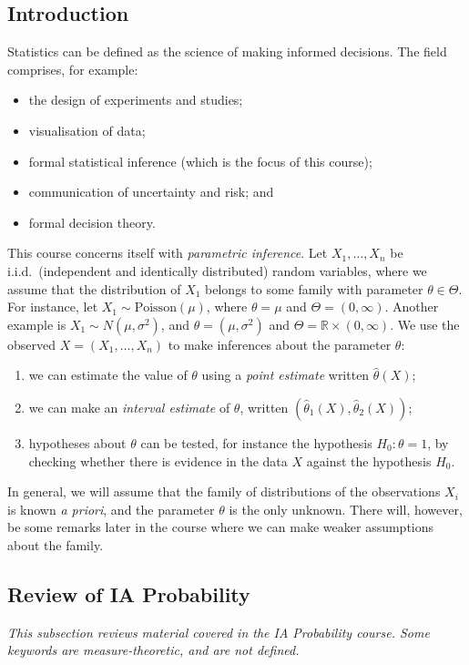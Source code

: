 \subsection{Introduction}
Statistics can be defined as the science of making informed decisions.
The field comprises, for example:
\begin{itemize}
	\item the design of experiments and studies;
	\item visualisation of data;
	\item formal statistical inference (which is the focus of this course);
	\item communication of uncertainty and risk; and
	\item formal decision theory.
\end{itemize}
This course concerns itself with \textit{parametric inference}.
Let \( X_1, \dots, X_n \) be i.i.d.\ (independent and identically distributed) random variables, where we assume that the distribution of \( X_1 \) belongs to some family with parameter \( \theta \in \Theta \).
For instance, let \( X_1 \sim \mathrm{Poisson}(\mu) \), where \( \theta = \mu \) and \( \Theta = (0, \infty) \).
Another example is \( X_1 \sim N(\mu, \sigma^2) \), and \( \theta = (\mu, \sigma^2) \) and \( \Theta = \mathbb R \times (0, \infty) \).
We use the observed \( X = (X_1, \dots, X_n) \) to make inferences about the parameter \( \theta \):
\begin{enumerate}
	\item we can estimate the value of \( \theta \) using a \textit{point estimate} written \( \hat \theta(X) \);
	\item we can make an \textit{interval estimate} of \( \theta \), written \( (\hat \theta_1(X), \hat \theta_2(X)) \);
	\item hypotheses about \( \theta \) can be tested, for instance the hypothesis \( H_0 \colon \theta = 1 \), by checking whether there is evidence in the data \( X \) against the hypothesis \( H_0 \).
\end{enumerate}
\begin{remark}
	In general, we will assume that the family of distributions of the observations \( X_i \) is known \textit{a priori}, and the parameter \( \theta \) is the only unknown.
	There will, however, be some remarks later in the course where we can make weaker assumptions about the family.
\end{remark}

\subsection{Review of IA Probability}
\textit{This subsection reviews material covered in the IA Probability course.
	Some keywords are measure-theoretic, and are not defined.}

